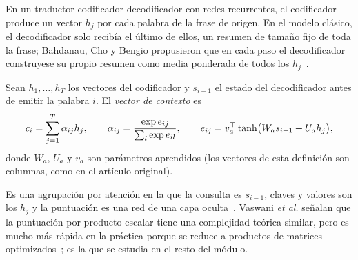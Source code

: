 En un traductor codificador-decodificador con redes recurrentes, el codificador produce un vector $h_j$ por cada palabra de la frase de origen. En el modelo clásico, el decodificador solo recibía el último de ellos, un resumen de tamaño fijo de toda la frase; Bahdanau, Cho y Bengio propusieron que en cada paso el decodificador construyese su propio resumen como media ponderada de todos los $h_j$~\cite[§3.1]{bahdanau}.

\begin{definicion}\label{def:aditiva}
Sean $h_1,\dots,h_{T}$ los vectores del codificador y $s_{i-1}$ el estado del decodificador antes de emitir la palabra $i$. El \emph{vector de contexto} es
\[
c_i=\sum_{j=1}^{T}\alpha_{ij}h_j,\qquad \alpha_{ij}=\frac{\exp e_{ij}}{\sum_{l}\exp e_{il}},\qquad e_{ij}=v_a^{\top}\tanh\bigl(W_as_{i-1}+U_ah_j\bigr),
\]
donde $W_a$, $U_a$ y $v_a$ son parámetros aprendidos (los vectores de esta definición son columnas, como en el artículo original).
\end{definicion}

Es una agrupación por atención en la que la consulta es $s_{i-1}$, claves y valores son los $h_j$ y la puntuación es una red de una capa oculta~\cite[apéndice~A.1.2]{bahdanau}. Vaswani \emph{et al.} señalan que la puntuación por producto escalar tiene una complejidad teórica similar, pero es mucho más rápida en la práctica porque se reduce a productos de matrices optimizados~\cite[§3.2.1]{vaswani}; es la que se estudia en el resto del módulo.

